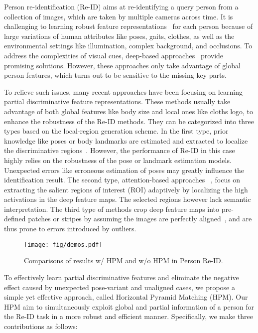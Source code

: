 \documentclass[letterpaper]{article} \usepackage{aaai19}  \usepackage{times}  \usepackage{helvet}  \usepackage{courier}  \usepackage{url}  \usepackage{graphicx}  \frenchspacing  \setlength{\pdfpagewidth}{8.5in}  \setlength{\pdfpageheight}{11in}  \usepackage{multirow}
\begin{document}
Person re-identification (Re-ID) aims at re-identifying a query person from a collection of images, which are taken by multiple cameras across time. It is challenging to learning robust feature representations~\cite{yang2009linear} for each person because of large variations of human attributes like poses, gaits, clothes, as well as the environmental settings like illumination, complex background, and occlusions. 
To address the complexities of visual cues, deep-based approaches~\cite{ahmed2015improved,hermans2017defense,ding2015deep,chen2017multi,li2014deepreid} provide promising solutions. However, these approaches only take advantage of global person features, which turns out to be sensitive to the missing key parts. 



To relieve such issues, many recent approaches have been focusing on learning partial discriminative feature representations. These methods usually take advantage of both global features like body size and local ones like cloths logo, to enhance the robustness of the Re-ID methods. They can be categorized into three types based on the local-region generation scheme. In the first type, prior knowledge like poses or body landmarks are estimated and extracted to localize the discriminative regions~\cite{su2017pose,zheng2017pose,wei2017glad}. However, the performance of Re-ID in this case highly relies on the robustness of the pose or landmark estimation models. Unexpected errors like erroneous estimation of poses may greatly influence the identification result. The second type, attention-based approaches ~\cite{liu2016end,liu2017hydraplus,Zhao2017DeeplyLearnedPR,li2018harmonious,fu2019sta}, focus on extracting the salient regions of interest (ROI) adaptively by localizing the high activations in the deep feature maps. The selected regions however lack semantic interpretation. The third type of methods crop deep feature maps into pre-defined patches or stripes by assuming the images are perfectly aligned~\cite{sun2017beyond,li2017learning}, and are thus prone to errors introduced by outliers.

\begin{figure*}[t]
	\centering
	\texttt{[image: fig/demos.pdf]}
	\caption{Comparisons of results w/ HPM and w/o HPM in Person Re-ID.}
	\vspace{-5mm}
	\label{fig:demos}
\end{figure*}


To effectively learn partial discriminative features and eliminate the negative effect caused by unexpected pose-variant and unaligned cases, we propose a simple yet effective approach, called Horizontal Pyramid Matching (HPM). Our HPM aim to simultaneously exploit global and partial information of a person for the Re-ID task in a more robust and efficient manner. Specifically, we make three contributions as follows:
\end{document}
